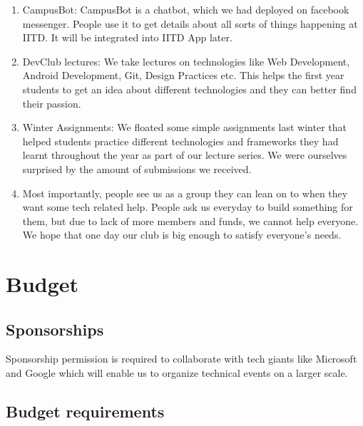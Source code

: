 \documentclass[11pt,a4paper]{article}
\begin{document}
\begin{enumerate}
        \item CampusBot: CampusBot is a chatbot, which we had deployed on facebook messenger. People use it to get details about all sorts of things happening at IITD. It will be integrated into IITD App later.
        \item DevClub lectures: We take lectures on technologies like Web Development, Android Development, Git, Design Practices etc. This helps the first year students to get an idea about different technologies and they can better find their passion.
        \item Winter Assignments: We floated some simple assignments last winter that helped students practice different technologies and frameworks they had learnt throughout the year as part of our lecture series. We were ourselves surprised by the amount of submissions we received.
        \item Most importantly, people see us as a group they can lean on to when they want some tech related help. People ask us everyday to build something for them, but due to lack of more members and funds, we cannot help everyone. We hope that one day our club is big enough to satisfy everyone's needs.
    \end{enumerate}
    \section{Budget}
    \subsection{Sponsorships}
    Sponsorship permission is required to collaborate with tech giants like Microsoft and Google which will enable us to organize technical events on a larger scale. 
    
    \subsection{Budget requirements}
    
\end{document}
